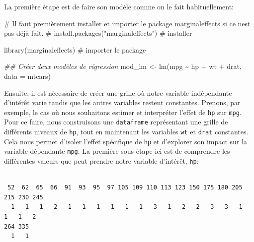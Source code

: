 \documentclass[
  letterpaper,
  DIV=11,
  numbers=noendperiod]{scrreprt}
\newenvironment{Shaded}{\begin{snugshade}}{\end{snugshade}}
\newcommand{\AttributeTok}[1]{\textcolor[rgb]{0.40,0.45,0.13}{#1}}
\newcommand{\CommentTok}[1]{\textcolor[rgb]{0.37,0.37,0.37}{#1}}
\newcommand{\DocumentationTok}[1]{\textcolor[rgb]{0.37,0.37,0.37}{\textit{#1}}}
\newcommand{\FunctionTok}[1]{\textcolor[rgb]{0.28,0.35,0.67}{#1}}
\newcommand{\NormalTok}[1]{\textcolor[rgb]{0.00,0.23,0.31}{#1}}
\newcommand{\OtherTok}[1]{\textcolor[rgb]{0.00,0.23,0.31}{#1}}
\newcommand{\SpecialCharTok}[1]{\textcolor[rgb]{0.37,0.37,0.37}{#1}}
\begin{document}
La première étape est de faire son modèle comme on le fait
habituellement:

\begin{Shaded}
\begin{Highlighting}[]
\CommentTok{\# Il faut premièrement installer et importer le package marginaleffects si ce n\textquotesingle{}est pas déjà fait.}
\CommentTok{\# install.packages("marginaleffects") \# installer}

\FunctionTok{library}\NormalTok{(marginaleffects) }\CommentTok{\# importer le package}

\DocumentationTok{\#\# Créer deux modèles de régression}
\NormalTok{mod\_lm }\OtherTok{\textless{}{-}} \FunctionTok{lm}\NormalTok{(mpg }\SpecialCharTok{\textasciitilde{}}\NormalTok{ hp }\SpecialCharTok{+}\NormalTok{ wt }\SpecialCharTok{+}\NormalTok{ drat, }\AttributeTok{data =}\NormalTok{ mtcars)}
\end{Highlighting}
\end{Shaded}

Ensuite, il est nécessaire de créer une grille où notre variable
indépendante d'intérêt varie tandis que les autres variables restent
constantes. Prenons, par exemple, le cas où nous souhaitons estimer et
interpréter l'effet de \texttt{hp} sur \texttt{mpg}. Pour ce faire, nous
construisons une \texttt{dataframe} représentant une grille de
différents niveaux de \texttt{hp}, tout en maintenant les variables
\texttt{wt} et \texttt{drat} constantes. Cela nous permet d'isoler
l'effet spécifique de \texttt{hp} et d'explorer son impact sur la
variable dépendante \texttt{mpg}. La première sous-étape ici est de
comprendre les différentes valeurs que peut prendre notre variable
d'intérêt, \texttt{hp}:

\begin{Shaded}
\end{Shaded}

\begin{verbatim}

 52  62  65  66  91  93  95  97 105 109 110 113 123 150 175 180 205 215 230 245 
  1   1   1   2   1   1   1   1   1   1   3   1   2   2   3   3   1   1   1   2 
264 335 
  1   1 
\end{verbatim}

\begin{Shaded}
\end{Shaded}
\end{document}
